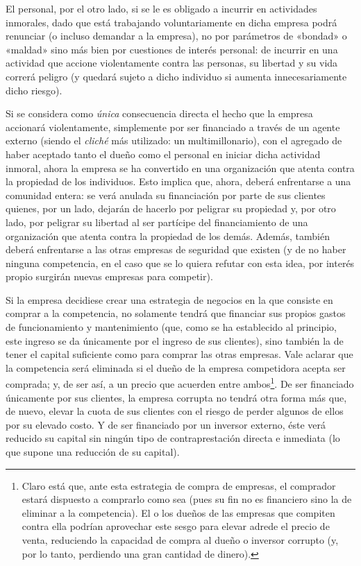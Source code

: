 \documentclass[12pt,a4paper,twoside]{book}
\begin{document}
El personal, por el otro lado, si se le es obligado a incurrir en actividades inmorales, dado que está trabajando voluntariamente en dicha empresa podrá renunciar (o incluso demandar a la empresa), no por parámetros de «bondad» o «maldad» sino más bien por cuestiones de interés personal: de incurrir en una actividad que accione violentamente contra las personas, su libertad y su vida correrá peligro (y quedará sujeto a dicho individuo si aumenta innecesariamente dicho riesgo).

Si se considera como \textit{única} consecuencia directa el hecho que la empresa accionará violentamente, simplemente por ser financiado a través de un agente externo (siendo el \textit{cliché} más utilizado: un multimillonario), con el agregado de haber aceptado tanto el dueño como el personal en iniciar dicha actividad inmoral, ahora la empresa se ha convertido en una organización que atenta contra la propiedad de los individuos. Esto implica que, ahora, deberá enfrentarse a una comunidad entera: se verá anulada su financiación por parte de sus clientes quienes, por un lado, dejarán de hacerlo por peligrar su propiedad y, por otro lado, por peligrar su libertad al ser partícipe del financiamiento de una organización que atenta contra la propiedad de los demás. Además, también deberá enfrentarse a las otras empresas de seguridad que existen (y de no haber ninguna competencia, en el caso que se lo quiera refutar con esta idea, por interés propio surgirán nuevas empresas para competir).

Si la empresa decidiese crear una estrategia de negocios en la que consiste en comprar a la competencia, no solamente tendrá que financiar sus propios gastos de funcionamiento y mantenimiento (que, como se ha establecido al principio, este ingreso se da únicamente por el ingreso de sus clientes), sino también la de tener el capital suficiente como para comprar las otras empresas. Vale aclarar que la competencia será eliminada si el dueño de la empresa competidora acepta ser comprada; y, de ser así, a un precio que acuerden entre ambos\footnote{Claro está que, ante esta estrategia de compra de empresas, el comprador estará dispuesto a comprarlo como sea (pues su fin no es financiero sino la de eliminar a la competencia). El o los dueños de las empresas que compiten contra ella podrían aprovechar este sesgo para elevar adrede el precio de venta, reduciendo la capacidad de compra al dueño o inversor corrupto (y, por lo tanto, perdiendo una gran cantidad de dinero).}. De ser financiado únicamente por sus clientes, la empresa corrupta no tendrá otra forma más que, de nuevo, elevar la cuota de sus clientes con el riesgo de perder algunos de ellos por su elevado costo. Y de ser financiado por un inversor externo, éste verá reducido su capital sin ningún tipo de contraprestación directa e inmediata (lo que supone una reducción de su capital).
\end{document}
